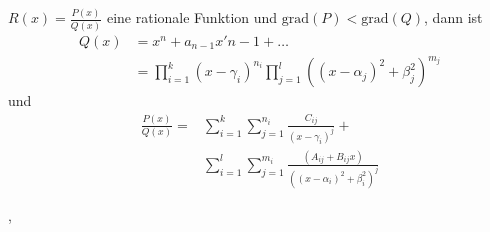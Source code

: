 \Satz[5.1.9] $R(x) = \frac{P(x)}{Q(x)}$ eine rationale Funktion und $\text{grad}(P) < \text{grad}(Q)$, dann ist
\begin{align*}
Q(x) &= x^n + a_{n-1}x'{n-1}+\dots \\
	 &=	\prod_{i=1}^{k}\left(x-\gamma_{i}\right)^{n_{i}} \prod_{j=1}^{l}\left(\left(x-\alpha_{j}\right)^{2}+\beta_{j}^{2}\right)^{m_{j}} 
\end{align*}
und
\begin{align*}
\frac{P(x)}{Q(x)}=&\sum_{i=1}^{k} \sum_{j=1}^{n_{i}} \frac{C_{i j}}{\left(x-\gamma_{i}\right)^{j}}+ \\
				 &\sum_{i=1}^{l} \sum_{j=1}^{m_{i}} \frac{\left(A_{i j}+B_{i j} x\right)}{\left(\left(x-\alpha_{i}\right)^{2}+\beta_{i}^{2}\right)^{j}}
\end{align*}

\sep